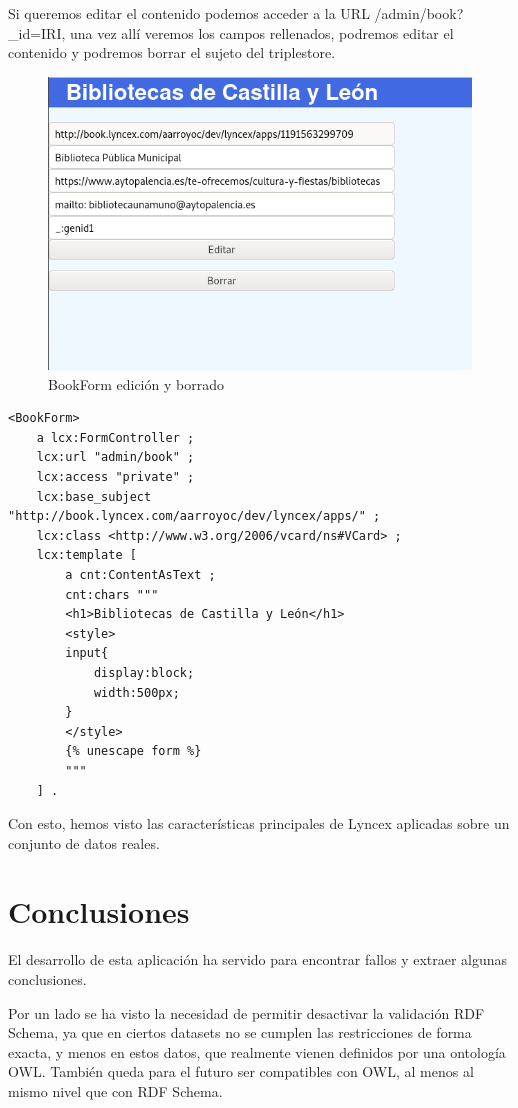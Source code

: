 \documentclass[12pt]{report} %
\begin{document}
Si queremos editar el contenido podemos acceder a la URL /admin/book?\_id=IRI, una vez allí veremos los campos rellenados, podremos editar el contenido y podremos borrar el sujeto del triplestore.

\begin{figure}
    \centering
    \includegraphics[width=\textwidth]{tour/bibliocyl7.png}
    \caption{BookForm edición y borrado}
    \label{fig:bibliocyl7}
\end{figure}

\begin{lstlisting}
<BookForm>
    a lcx:FormController ;
    lcx:url "admin/book" ;
    lcx:access "private" ;
    lcx:base_subject "http://book.lyncex.com/aarroyoc/dev/lyncex/apps/" ;
    lcx:class <http://www.w3.org/2006/vcard/ns#VCard> ;
    lcx:template [
        a cnt:ContentAsText ;
        cnt:chars """
        <h1>Bibliotecas de Castilla y León</h1>
        <style>
        input{
            display:block;
            width:500px;
        }
        </style>
        {% unescape form %}
        """
    ] .
\end{lstlisting}

Con esto, hemos visto las características principales de Lyncex aplicadas sobre un conjunto de datos reales.

\section{Conclusiones}

El desarrollo de esta aplicación ha servido para encontrar fallos y extraer algunas conclusiones.

Por un lado se ha visto la necesidad de permitir desactivar la validación RDF Schema, ya que en ciertos datasets no se cumplen las restricciones de forma exacta, y menos en estos datos, que realmente vienen definidos por una ontología OWL. También queda para el futuro ser compatibles con OWL, al menos al mismo nivel que con RDF Schema.
\end{document}
